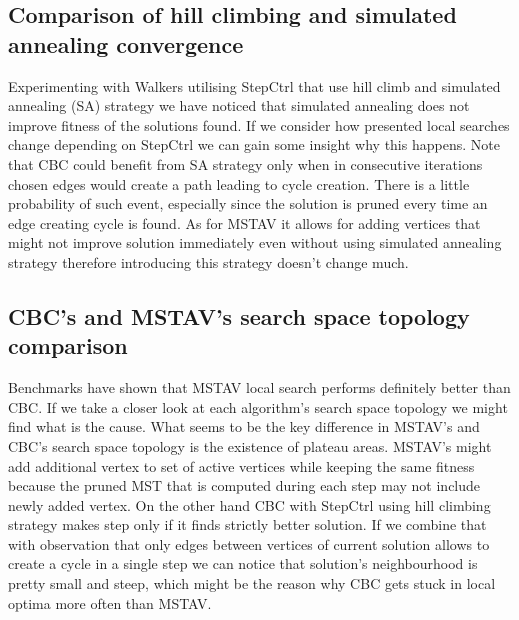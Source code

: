 \subsection{Comparison of hill climbing and simulated annealing convergence}
\FloatBarrier
Experimenting with Walkers utilising StepCtrl that use hill climb and simulated annealing (SA)
strategy we have noticed that simulated annealing does not improve fitness of the solutions found.
If we consider how presented local searches change depending on StepCtrl we can gain some insight why this happens.
Note that CBC could benefit from SA strategy only when in consecutive iterations chosen edges would create a path leading to cycle creation. There is a little probability of such event, especially since the solution is pruned every time an edge creating cycle is found. As for MSTAV it allows for adding vertices that might not improve solution immediately even without using simulated annealing strategy therefore introducing this strategy doesn't change much.

\begin{figure}[hb]

\end{figure}
\begin{figure}[hb]

\end{figure}
\FloatBarrier

\subsection{CBC's and MSTAV's search space topology comparison}
\FloatBarrier
Benchmarks have shown that MSTAV local search performs definitely better than CBC. If we take a closer look at each algorithm's search space topology we might find what is the cause. What seems to be the key difference in MSTAV's and CBC's search space topology is the existence of plateau areas. MSTAV's might add additional vertex to set of active vertices while keeping the same fitness because the pruned MST that is computed during each step may not include newly added vertex. On the other hand CBC with StepCtrl using hill climbing strategy makes step only if it finds strictly better solution. If we combine that with observation that only edges between vertices of current solution allows to create a cycle in a single step we can notice that solution's neighbourhood is pretty small and steep, which might be the reason why CBC gets stuck in local optima more often than MSTAV.
\begin{figure}[hb]

\end{figure}
\FloatBarrier

